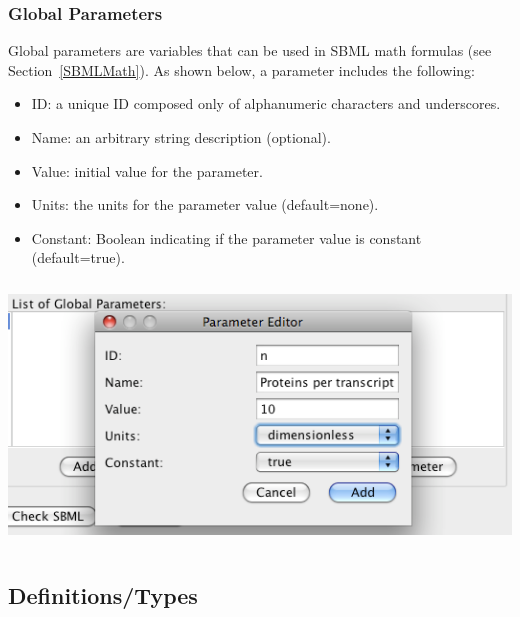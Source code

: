 \documentclass[titlepage,11pt]{article}
\begin{document}
\subsubsection{\label{parameters}Global Parameters}

\noindent
Global parameters are variables that can 
be used in SBML math formulas (see Section~\ref{SBMLMath}).  
As shown below, a parameter includes the following:
\begin{itemize}
\item ID: a unique ID composed only of alphanumeric characters and 
       underscores.
\item Name: an arbitrary string description (optional).
\item Value: initial value for the parameter.
\item Units: the units for the parameter value (default=none).
\item Constant: Boolean indicating if the parameter value 
       is constant (default=true).
\end{itemize}
\begin{center}
\includegraphics[height=70mm]{screenshots/parameter}
\end{center}

\subsection{\label{DefnTypes}Definitions/Types}
\end{document}
